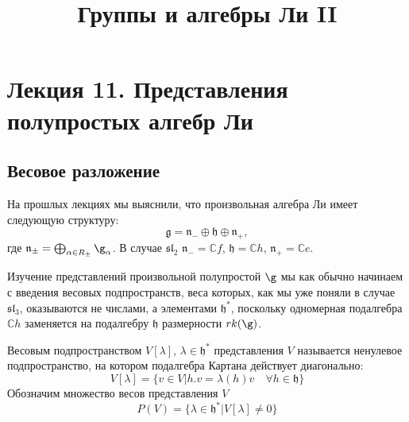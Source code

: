 \documentclass[a4article]{article}
\title{Группы и алгебры Ли II}
\author{}
\date{}
\begin{document}
\maketitle

\section*{Лекция 11. Представления полупростых алгебр Ли}

\subsection*{Весовое разложение}

На прошлых лекциях мы выяснили, что произвольная алгебра Ли имеет следующую структуру:
\begin{equation}
    \mathfrak{g} = \mathfrak{n}_{-}\oplus \mathfrak{h}\oplus \mathfrak{n}_{+}, 
\end{equation}
где $\mathfrak{n}_{\pm}=\bigoplus_{\alpha \in R_{\pm}}\g_{\alpha}$. В случае $\mathfrak{sl}_2$ $\mathfrak{n}_{-}=\mathbb{C}f$, $\mathfrak{h}=\mathbb{C}h$, $\mathfrak{n}_{+}=\mathbb{C}e$.

Изучение представлений произвольной полупростой $\g$ мы как обычно начинаем с введения весовых подпространств, веса которых, как мы уже поняли в случае $\mathfrak{sl}_3$, оказываются не числами, а элементами $\mathfrak{h}^*$, поскольку одномерная подалгебра $\mathbb{C}h$ заменяется на подалгебру $\mathfrak{h}$ размерности $rk(\g)$.


\begin{definition}
    Весовым подпространством $V[\lambda]$, $\lambda \in \mathfrak{h}^*$ представления $V$ называется ненулевое подпространство, на котором подалгебра Картана действует диагонально:
    \begin{equation}
        V[\lambda]=\{v \in V|h.v=\lambda(h)v \quad \forall h \in \mathfrak{h}\}
    \end{equation}
    Обозначим множество весов представления $V$
    \begin{equation}
        P(V)=\{\lambda \in \mathfrak{h}^*|V[\lambda] \ne 0\}
    \end{equation}
\end{definition}
\end{document}
